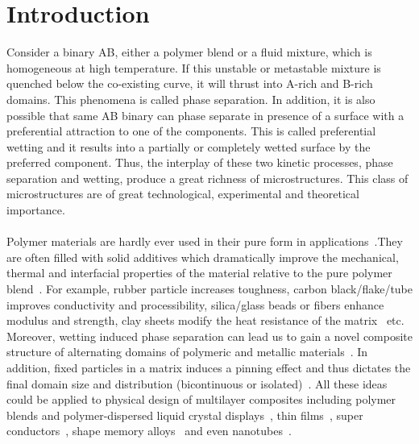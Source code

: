 \documentclass[12pt]{iiscthes}
\theoremstyle{definition}
\theoremstyle{definition}
\theoremstyle{remark}
\begin{document}
\chapter{Introduction}
Consider a binary AB, either a polymer blend or a fluid mixture, which is homogeneous at high temperature. If this unstable or metastable mixture is quenched below the co-existing curve, it will thrust into  A-rich and B-rich domains. This phenomena is called phase separation. In addition, it is also possible that same AB binary can phase separate in presence of a surface with a preferential attraction to one of the components. This is called preferential wetting and it results into a partially or completely wetted surface by the preferred component. Thus, the interplay of these two kinetic processes, phase separation and wetting, produce a great richness of microstructures. This class of microstructures are of great technological, experimental and theoretical importance. 
\\ \\
Polymer materials are hardly ever used in their pure form in applications~\cite{Karim}.They are often filled with solid additives which dramatically improve the mechanical, thermal and interfacial properties of the material relative to the pure polymer blend~\cite{Balazs}. For example, rubber particle increases toughness, carbon black/flake/tube improves conductivity and processibility, silica/glass beads or fibers enhance modulus and strength, clay sheets modify the heat resistance of the matrix~\cite{Balazs} etc. Moreover, wetting induced phase separation can lead us to gain a novel composite structure of alternating domains of polymeric and metallic materials~\cite{Balazs}. In addition, fixed particles in a matrix induces a pinning effect and thus dictates the final domain size and distribution (bicontinuous or isolated)~\cite{Tanaka}. All these ideas could be applied to physical design of multilayer composites including polymer blends and polymer-dispersed liquid crystal displays~\cite{Tanaka}, thin films~\cite{RNauman}, super conductors~\cite{Link2}, shape memory alloys~\cite{Link2} and even nanotubes~\cite{Fan}. 
\\ \\
\end{document}
